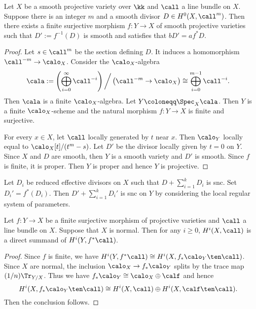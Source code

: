     \begin{lemma}\label{lem: cyclic covering map in Kodaira Vanishing}
        Let \(X\) be a smooth projective variety over \(\kk\) and \(\call\) a line bundle on \(X\).
        Suppose there is an integer \(m\) and a smooth divisor \(D \in H^0(X, \call^m)\).
        Then there exists a finite surjective morphism \(f:Y \to X\) of smooth projective varieties such that \(D':= f^{-1}(D)\) is smooth and satisfies that \(bD' = af^*D\).
    \end{lemma}
    \begin{proof}
        Let \(s \in \call^m\) be the section defining \(D\).
        It induces a homomorphism \(\call^{-m} \to \calo_X\).
        Consider the \(\calo_X\)-algebra 
        \[ \cala := \left(\bigoplus_{i = 0}^{\infty} \call^{-i}\right) \bigg/\left(\call^{-m} \to \calo_X\right) \cong \bigoplus_{i = 0}^{m-1} \call^{-i}. \]
        Then \(\cala\) is a finite \(\calo_X\)-algebra.
        Let \(Y \coloneqq \Spec_X \cala\).
        Then \(Y\) is a finite \(\calo_X\)-scheme and the natural morphism \(f: Y \to X\) is finite and surjective.

        For every \(x \in X\), let \(\call\) locally generated by \(t\) near \(x\).
        Then \(\calo_Y\) locally equal to \(\calo_X[t]/(t^m - s)\).
        Let \(D'\) be the divisor locally given by \(t=0\) on \(Y\).
        Since \(X\) and \(D\) are smooth, then \(Y\) is a smooth variety and \(D'\) is smooth.
        Since \(f\) is finite, it is proper.
        Then \(Y\) is proper and hence \(Y\) is projective.
    \end{proof}
    \begin{remark}\label{rmk: cyclic covering map in Kodaira Vanishing can preverse snc}
        Let \(D_i\) be reduced effective divisors on \(X\) such that \(D + \sum_{i=1}^k D_i\) is snc.
        Set \(D_i' = f^*(D_i)\).
        Then \(D' + \sum_{i=1}^k D_i'\) is snc on \(Y\) by considering the local regular system of parameters.
    \end{remark}

    \begin{lemma}\label{lem: injectivity of cohomology of finite pullback of line bundle}
        Let \(f:Y \to X\) be a finite surjective morphism of projective varieties and \(\call\) a line bundle on \(X\).
        Suppose that \(X\) is normal.
        Then for any \(i \geq 0\), \(H^i(X,\call)\) is a direct summand of \(H^i(Y, f^*\call)\).
    \end{lemma}
    \begin{proof}
        Since \(f\) is finite, we have \(H^i(Y, f^*\call) \cong H^i(X, f_*\calo_Y \ten \call)\).
        Since \(X\) are normal, the inclusion \(\calo_X \to f_*\calo_Y\) splits by the trace map \((1/n)\Tr_{Y/X}\).
        Thus we have \(f_*\calo_Y \cong \calo_X \oplus \calf\) and hence 
        \[ H^i(X, f_*\calo_Y \ten \call) \cong H^i(X, \call) \oplus H^i(X, \calf \ten \call). \]
        Then the conclusion follows.
    \end{proof}

